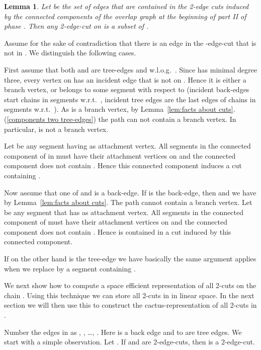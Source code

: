 \documentclass[paper=a4]{scrartcl}
\newtheorem{lemma}{Lemma}
\newcommand{\mqed}{\hfill}
\newlength{\proofpostskipamount}\newlength{\proofpreskipamount}
\newenvironment{proof}{\par\vspace{\proofpreskipamount}\noindent{\textbf{Proof:}}\hspace{0.5em}}{\nopagebreak \strut\nopagebreak \hspace{\fill}\mqed\par\vspace{\proofpostskipamount}\noindent}
\begin{document}
\begin{lemma}\label{lem:h induces all cuts}
Let  be the set of edges that are contained in the 2-edge cuts induced by the connected components of the overlap graph  at the beginning of part II of phase . Then any 2-edge-cut  on  is a subset of .
\end{lemma}
\begin{proof}
Assume for the sake of contradiction that there is an edge  in the -edge-cut that is not in . We distinguish the following cases.

First assume that both  and  are tree-edges and w.l.o.g.\ . Since  has minimal degree three, every vertex on  has an incident edge that is not on . Hence it is either a branch vertex, or belongs to some segment with respect to  (incident back-edges start chains in segments w.r.t.\ , incident tree edges are the last edges of chains in segments w.r.t.\ ). As  is a branch vertex, by Lemma~\ref{lem:facts about cuts}.(\ref{components two tree-edges}) the path  can not contain a branch vertex. In particular,  is not a branch vertex.

Let  be any segment having  as attachment vertex. All segments in the connected component of  in  must have their attachment vertices on  and the connected component does not contain . Hence this connected component induces a cut containing .

Now assume that one of  and  is a back-edge. If  is the back-edge, then  and we have  by Lemma~\ref{lem:facts about cuts}. The path  cannot contain a branch vertex. Let  be any segment that has  as attachment vertex. All segments in the connected component of  must have their attachment vertices on  and the connected component does not contain . Hence  is contained in a cut induced by this connected component.

If on the other hand  is the tree-edge we have  basically the same argument applies when we replace  by a segment  containing .
\end{proof}





We next show how to compute a space efficient representation of all 2-cuts on the chain . Using this technique we can store all 2-cuts in  in linear space. In the next section we will then use this to construct the cactus-representation of all 2-cuts in .

Number the edges in  as , , \ldots, . Here  is a back edge and  to  are tree edges. We start with a simple observation. Let . If  and  are 2-edge-cuts, then  is a 2-edge-cut.
\end{document}
